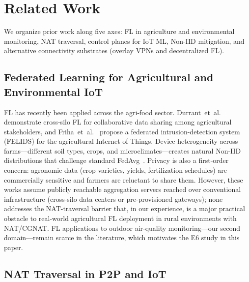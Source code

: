 \documentclass[a4paper,fleqn]{cas-dc}
\begin{document}
\section{Related Work}
\label{sec:related}

We organize prior work along five axes: FL in agriculture and environmental monitoring, NAT traversal, control planes for IoT ML, Non-IID mitigation, and alternative connectivity substrates (overlay VPNs and decentralized FL).

\subsection{Federated Learning for Agricultural and Environmental IoT}

FL has recently been applied across the agri-food sector. Durrant~et~al.~\cite{durrant2022} demonstrate cross-silo FL for collaborative data sharing among agricultural stakeholders, and Friha~et~al.~\cite{friha2022} propose a federated intrusion-detection system (FELIDS) for the agricultural Internet of Things. Device heterogeneity across farms---different soil types, crops, and microclimates---creates natural Non-IID distributions that challenge standard FedAvg~\cite{mcmahan2017}. Privacy is also a first-order concern: agronomic data (crop varieties, yields, fertilization schedules) are commercially sensitive and farmers are reluctant to share them. However, these works assume publicly reachable aggregation servers reached over conventional infrastructure (cross-silo data centers or pre-provisioned gateways); none addresses the NAT-traversal barrier that, in our experience, is a major practical obstacle to real-world agricultural FL deployment in rural environments with NAT/CGNAT. FL applications to outdoor air-quality monitoring---our second domain---remain scarce in the literature, which motivates the E6 study in this paper.

\subsection{NAT Traversal in P2P and IoT}
\end{document}
